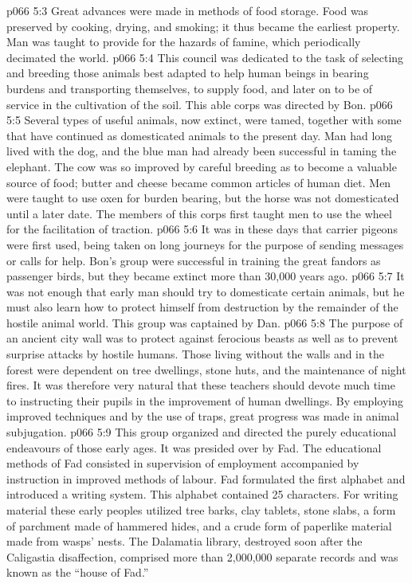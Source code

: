 \vs p066 5:3 Great advances were made in methods of food storage. Food was preserved by cooking, drying, and smoking; it thus became the earliest property. Man was taught to provide for the hazards of famine, which periodically decimated the world.
\vs p066 5:4 \bibnobreakspace {} This council was dedicated to the task of selecting and breeding those animals best adapted to help human beings in bearing burdens and transporting themselves, to supply food, and later on to be of service in the cultivation of the soil. This able corps was directed by Bon.
\vs p066 5:5 Several types of useful animals, now extinct, were tamed, together with some that have continued as domesticated animals to the present day. Man had long lived with the dog, and the blue man had already been successful in taming the elephant. The cow was so improved by careful breeding as to become a valuable source of food; butter and cheese became common articles of human diet. Men were taught to use oxen for burden bearing, but the horse was not domesticated until a later date. The members of this corps first taught men to use the wheel for the facilitation of traction.
\vs p066 5:6 It was in these days that carrier pigeons were first used, being taken on long journeys for the purpose of sending messages or calls for help. Bon’s group were successful in training the great fandors as passenger birds, but they became extinct more than 30,000 years ago.
\vs p066 5:7 \bibnobreakspace {} It was not enough that early man should try to domesticate certain animals, but he must also learn how to protect himself from destruction by the remainder of the hostile animal world. This group was captained by Dan.
\vs p066 5:8 The purpose of an ancient city wall was to protect against ferocious beasts as well as to prevent surprise attacks by hostile humans. Those living without the walls and in the forest were dependent on tree dwellings, stone huts, and the maintenance of night fires. It was therefore very natural that these teachers should devote much time to instructing their pupils in the improvement of human dwellings. By employing improved techniques and by the use of traps, great progress was made in animal subjugation.
\vs p066 5:9 \bibnobreakspace {} This group organized and directed the purely educational endeavours of those early ages. It was presided over by Fad. The educational methods of Fad consisted in supervision of employment accompanied by instruction in improved methods of labour. Fad formulated the first alphabet and introduced a writing system. This alphabet contained 25 characters. For writing material these early peoples utilized tree barks, clay tablets, stone slabs, a form of parchment made of hammered hides, and a crude form of paperlike material made from wasps’ nests. The Dalamatia library, destroyed soon after the Caligastia disaffection, comprised more than 2,000,000 separate records and was known as the “house of Fad.”
